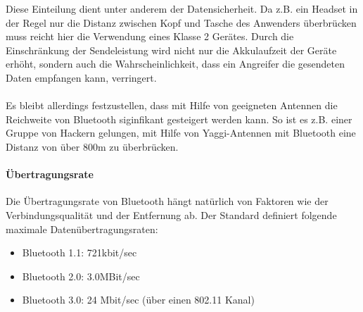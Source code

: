                 Diese Einteilung dient unter anderem der Datensicherheit. Da z.B. 
                ein Headset in der Regel nur die Distanz zwischen Kopf und Tasche
                des Anwenders überbrücken muss reicht hier die Verwendung eines Klasse 2
                Gerätes. Durch die Einschränkung der Sendeleistung wird nicht nur die
                Akkulaufzeit der Geräte erhöht, sondern auch die Wahrscheinlichkeit,
                dass ein Angreifer die gesendeten Daten empfangen kann, verringert.\\
                \\
                Es bleibt allerdings festzustellen, dass mit Hilfe von geeigneten
                Antennen die Reichweite von Bluetooth siginfikant gesteigert werden
                kann. So ist es z.B. einer Gruppe von Hackern gelungen, mit Hilfe von
                Yaggi-Antennen mit Bluetooth eine Distanz von über 800m zu überbrücken.
            \paragraph{Übertragungsrate}
                Die Übertragungsrate von Bluetooth hängt natürlich von Faktoren wie
                der Verbindungsqualität und der Entfernung ab. Der Standard definiert
                folgende maximale Datenübertragungsraten:

                \begin{itemize}
                    \item{Bluetooth 1.1:} 721kbit/sec
                    \item{Bluetooth 2.0:} 3.0MBit/sec
                    \item{Bluetooth 3.0:} 24 Mbit/sec (über einen 802.11 Kanal)
                \end{itemize}

